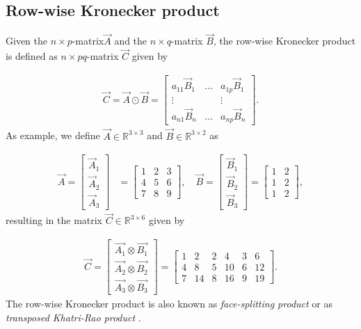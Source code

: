 \begin{appendices}
\section{Row-wise Kronecker product}

Given the $n \times p$-matrix$\vec{A}$ and the $n \times q$-matrix $\vec{B}$, the row-wise Kronecker product is defined as $n \times pq$-matrix $\vec{C}$ given by

\begin{align}
	\vec{C} = \vec{A} \odot \vec{B} = 
			\begin{bmatrix}
				a_{11} \vec{B}_1 & \dots & a_{1p} \vec{B}_1 \\
				\vdots 	   &         &  \vdots \\
				a_{n1} \vec{B}_n & \dots  & a_{np} \vec{B}_n     
			\end{bmatrix}. 
\end{align}
%
As example, we define $\vec{A} \in \mathbb{R}^{3 \times 3}$ and $\vec{B} \in \mathbb{R}^{3 \times 2}$ as

\begin{align}
	\vec{A} = 
		\begin{bmatrix}
			\vec{A}_1 \\
			\vec{A}_2 \\
			\vec{A}_3 
		\end{bmatrix} &= 
		\begin{bmatrix}
			1 & 2 & 3 \\
			4 & 5 & 6 \\
			7 & 8 & 9 
		\end{bmatrix}, \quad 
	\vec{B} = 
		\begin{bmatrix}
			\vec{B}_1 \\
			\vec{B}_2 \\
			\vec{B}_3 
		\end{bmatrix} = 
		\begin{bmatrix}
			1 & 2  \\
			1 & 2  \\
			1 & 2  
		\end{bmatrix},
\end{align}
%
resulting in the matrix $\vec{C} \in \mathbb{R}^{3 \times 6}$ given by

\begin{align}
		\vec{C} = 
	\begin{bmatrix}
		\vec{A_1} \otimes \vec{B_1} \\
		\vec{A_2} \otimes \vec{B_2} \\
		\vec{A_3} \otimes \vec{B_3} 
	\end{bmatrix} = 
	\begin{bmatrix}
		1 & 2 & 2 & 4 & 3 & 6 \\
		4 & 8 & 5 &10 & 6 & 12\\
		7 & 14& 8 & 16& 9 & 19 
	\end{bmatrix}.
\end{align}
%
The row-wise Kronecker product is also known as \emph{face-splitting product} or as \emph{transposed Khatri-Rao product} \cite{slyusar1997analytical}.


\end{appendices}
